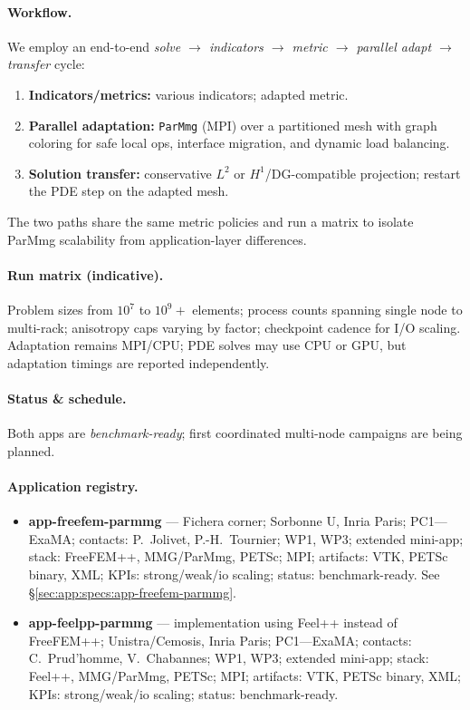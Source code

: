 \paragraph{Workflow.}
We employ an end-to-end \emph{solve $\rightarrow$ indicators $\rightarrow$ metric $\rightarrow$ parallel adapt $\rightarrow$ transfer} cycle:
\begin{enumerate}
  \item \textbf{Indicators/metrics:} various indicators; adapted metric.
  \item \textbf{Parallel adaptation:} \texttt{ParMmg} (MPI) over a partitioned mesh with graph coloring for safe local ops, interface migration, and dynamic load balancing.
  \item \textbf{Solution transfer:} conservative $L^2$ or $H^1$/DG-compatible projection; restart the PDE step on the adapted mesh.
\end{enumerate}
The two paths share the same metric policies and run a matrix to isolate ParMmg scalability from application-layer differences.


\paragraph{Run matrix (indicative).}
Problem sizes from $10^7$ to $10^9+$ elements; process counts spanning single node to multi-rack; anisotropy caps varying by factor; checkpoint cadence for I/O scaling.
Adaptation remains MPI/CPU; PDE solves may use CPU or GPU, but adaptation timings are reported independently.

\paragraph{Status \& schedule.}
Both apps are \emph{benchmark-ready}; first coordinated multi-node campaigns are being planned.
\paragraph{Application registry.}
\begin{itemize}
  \item \textbf{app-freefem-parmmg} — Fichera corner; Sorbonne U, Inria Paris; PC1—ExaMA; contacts: P.~Jolivet, P.-H.~Tournier; WP1, WP3; extended mini-app; stack: FreeFEM++, MMG/ParMmg, PETSc; MPI; artifacts: VTK, PETSc binary, XML; KPIs: strong/weak/io scaling; status: benchmark-ready. See \S\ref{sec:app:specs:app-freefem-parmmg}.
  \item \textbf{app-feelpp-parmmg} — implementation using Feel++ instead of FreeFEM++; Unistra/Cemosis, Inria Paris; PC1—ExaMA; contacts: C.~Prud’homme, V.~Chabannes; WP1, WP3; extended mini-app; stack: Feel++, MMG/ParMmg, PETSc; MPI; artifacts: VTK, PETSc binary, XML; KPIs: strong/weak/io scaling; status: benchmark-ready.
\end{itemize}


